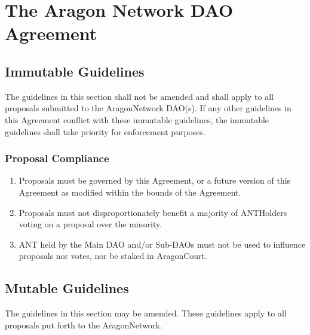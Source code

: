 
\chapter{The Aragon Network DAO Agreement}
\label{chap:ANDAOAgreement}
\restartnumbering

\section{Immutable Guidelines}
\label{sec:ImmutableGuidelines}

The guidelines in this section shall not be amended and shall apply to all proposals submitted to the \gls{AragonNetwork} \ac{DAO}(s).
If any other guidelines in this Agreement conflict with these immutable guidelines, the immutable guidelines shall take priority for enforcement purposes.


\subsection{Proposal Compliance}
\begin{enumerate}
	\item Proposals must be governed by this Agreement, or a future version of this Agreement as modified within the bounds of the Agreement.
	\item Proposals must not disproportionately benefit a majority of \glspl{ANTHolder} voting on a proposal over the minority.
	\item \ac{ANT} held by the Main \ac{DAO} and/or Sub-\acp{DAO} must not be used to influence proposals nor votes, nor be staked in \gls{AragonCourt}.
\end{enumerate}


\section{Mutable Guidelines}
\label{sec:MutableGuidelines}

The guidelines in this section may be amended.
These guidelines apply to all proposals put forth to the \gls{AragonNetwork}.

	
